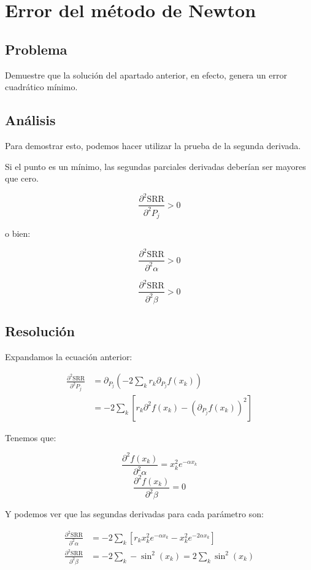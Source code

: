 \section{Error del método de Newton}

\subsection{Problema}

Demuestre que la solución del apartado anterior, en efecto, genera un error cuadrático mínimo.

\subsection{Análisis}

Para demostrar esto, podemos hacer utilizar la prueba de la segunda derivada. 

Si el punto es un mínimo, las segundas parciales derivadas deberían ser mayores que cero.

\begin{equation*}
	\frac{\partial^2 \text{SRR}}{\partial^2 P_j } > 0
\end{equation*}

o bien:

$$
	\frac{\partial^2 \text{SRR}}{\partial^2 \alpha } > 0
$$

$$
\frac{\partial^2 \text{SRR}}{\partial^2 \beta } > 0
$$

\subsection{Resolución}

Expandamos la ecuación anterior:

\begin{align*}
	\frac{\partial^2 \text{SRR}}{\partial^2 P_j } &=
	\partial_{P_j} (-2 \sum_k r_k \partial_{P_j} f(x_k)) \\
	&= -2 \sum_k 
		[ r_k \partial^2 f(x_k) - (\partial_{P_j} f(x_k))^2 ]
\end{align*}

Tenemos que:

$$
\frac{\partial^2 f(x_k) }{\partial^2 \alpha} = x_k^2 e^{-\alpha x_k}
$$
$$
\frac{\partial^2 f(x_k) }{\partial^2 \beta} = 0
$$

Y podemos ver que las segundas derivadas para cada parámetro son:


\begin{align*}
	\frac{\partial^2 \text{SRR}}{\partial^2 \alpha } &=
	-2 \sum_{k} [ r_k  x_k^2 e^{-\alpha x_k} -  x_k^2 e^{-2\alpha x_k}] \\
	\frac{\partial^2 \text{SRR}}{\partial^2 \beta} &=
	-2 \sum_{k} -\sin^2(x_k) = 2 \sum_{k} \sin^2(x_k)
\end{align*}

